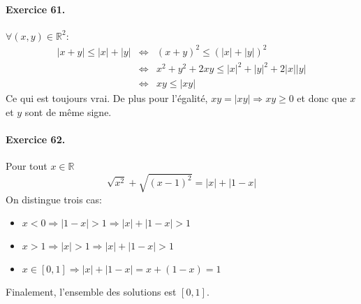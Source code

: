 \paragraph{Exercice 61.}  $\forall(x,y)\in\mathbb{R}^2$:
\begin{eqnarray}
  |x+y|\leq |x|+|y| &\Leftrightarrow& (x+y)^2\leq \left(|x|+|y|\right)^2 \nonumber \\
  &\Leftrightarrow& x^2+y^2 + 2xy\leq |x|^2+|y|^2 + 2|x||y| \nonumber \\
  &\Leftrightarrow& xy\leq |xy| \nonumber 
\end{eqnarray}
Ce qui est toujours vrai. De plus pour l'égalité, $xy=|xy| \Rightarrow xy\geq0$ et donc que $x$ et $y$ sont de même signe.

\paragraph{Exercice 62.} Pour tout $x\in\mathbb{R}$
\[
\sqrt{x^2} + \sqrt{(x-1)^2} = |x|+|1-x|
\]
On distingue trois cas:
\begin{itemize}
  \item $x<0 \Rightarrow |1-x| > 1 \Rightarrow |x|+|1-x| > 1$
  \item $x>1 \Rightarrow |x| > 1 \Rightarrow |x|+|1-x| > 1$
  \item $x\in[0,1]\Rightarrow |x|+|1-x|=x+(1-x)=1$
\end{itemize}
Finalement, l'ensemble des solutions est $[0,1]$.\\ \\

